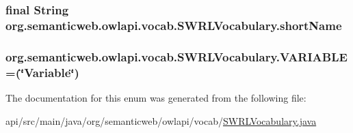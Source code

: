 \hypertarget{enumorg_1_1semanticweb_1_1owlapi_1_1vocab_1_1_s_w_r_l_vocabulary_a68ae204ba644bdd1793e721a829c9dc5}{
\subsubsection[{short\-Name}]{\setlength{\rightskip}{0pt plus 5cm}final String org.\-semanticweb.\-owlapi.\-vocab.\-S\-W\-R\-L\-Vocabulary.\-short\-Name\hspace{0.3cm}{\ttfamily [private]}}}\label{enumorg_1_1semanticweb_1_1owlapi_1_1vocab_1_1_s_w_r_l_vocabulary_a68ae204ba644bdd1793e721a829c9dc5}
\hypertarget{enumorg_1_1semanticweb_1_1owlapi_1_1vocab_1_1_s_w_r_l_vocabulary_a21111a34b7fd9e4a6b2a5671783fe3ed}{
\subsubsection[{V\-A\-R\-I\-A\-B\-L\-E}]{\setlength{\rightskip}{0pt plus 5cm}org.\-semanticweb.\-owlapi.\-vocab.\-S\-W\-R\-L\-Vocabulary.\-V\-A\-R\-I\-A\-B\-L\-E =(\char`\"{}Variable\char`\"{})}}\label{enumorg_1_1semanticweb_1_1owlapi_1_1vocab_1_1_s_w_r_l_vocabulary_a21111a34b7fd9e4a6b2a5671783fe3ed}


The documentation for this enum was generated from the following file\-:\begin{DoxyCompactItemize}
\item 
api/src/main/java/org/semanticweb/owlapi/vocab/\hyperlink{_s_w_r_l_vocabulary_8java}{S\-W\-R\-L\-Vocabulary.\-java}\end{DoxyCompactItemize}
